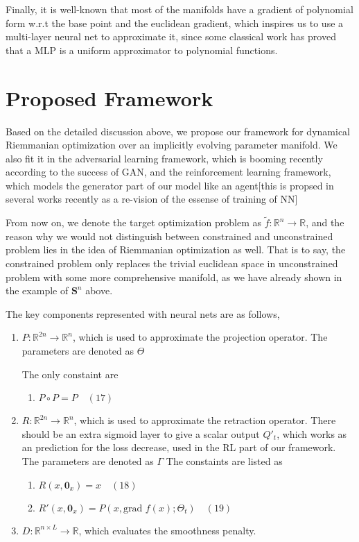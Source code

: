 \documentclass[letterpaper]{article}
\begin{document}
Finally, it is well-known that most of the manifolds have a gradient of polynomial form w.r.t the base point and the euclidean gradient, which inspires us to use a multi-layer neural net to approximate it, since
some classical work has proved that a MLP is a uniform approximator to polynomial functions.


\section{Proposed Framework}
Based on the detailed discussion above, we propose our framework for dynamical Riemmanian optimization over an implicitly evolving parameter manifold.
We also fit it in the adversarial learning framework, which is booming recently according to the success of GAN, and the reinforcement learning framework, which models the generator
part of our model like an agent[this is propsed in several works recently as a re-vision of the essense of training of NN]

From now on, we denote the target optimization problem as $\tilde{f}:\mathbb{R}^n\to\mathbb{R}$, and the reason why we would not distinguish between constrained and unconstrained
problem lies in the idea of Riemmanian optimization as well. That is to say, the constrained problem only replaces the trivial euclidean space in unconstrained problem with some more comprehensive
manifold, as we have already shown in the example of $\mathbf{S}^{n}$ above.

The key components represented with neural nets are as follows,
\begin{enumerate}
  \item $P:\mathbb{R}^{2n}\to\mathbb{R}^n$, which is used to approximate the projection operator. The parameters are denoted as $\Theta$

  The only constaint are
  \begin{enumerate}
    \item $P\circ{P}=P \quad (17)$
  \end{enumerate}
  \item $R:\mathbb{R}^{2n}\to\mathbb{R}^{n}$, which is used to approximate the retraction operator. There should be an extra sigmoid layer
  to give a scalar output $Q'_t$, which works as an prediction for the loss decrease, used in the RL part of our framework. The parameters are denoted as $\Gamma$
  The constaints are listed as
  \begin{enumerate}
    \item $R(x, \mathbf{0}_x)=x \quad (18)$
    \item $R'(x, \mathbf{0}_x)=P(x, \text{grad }f(x);\Theta_t) \quad (19)$
  \end{enumerate}
  \item $D:\mathbb{R}^{n\times{L}}\to\mathbb{R}$, which evaluates the smoothness penalty.
\end{enumerate}
\end{document}
